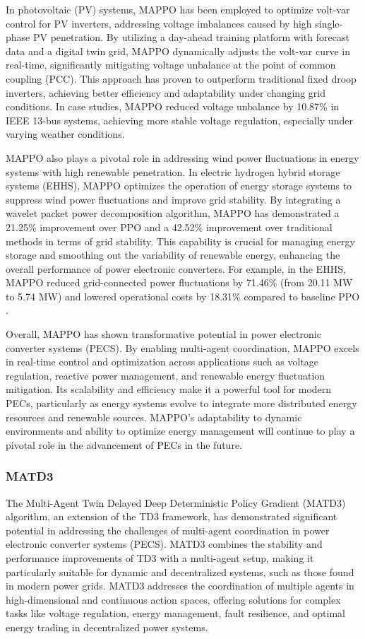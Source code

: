 In photovoltaic (PV) systems, MAPPO has been employed to optimize volt-var control for PV inverters, addressing voltage imbalances caused by high single-phase PV penetration. By utilizing a day-ahead training platform with forecast data and a digital twin grid, MAPPO dynamically adjusts the volt-var curve in real-time, significantly mitigating voltage unbalance at the point of common coupling (PCC). This approach has proven to outperform traditional fixed droop inverters, achieving better efficiency and adaptability under changing grid conditions. In case studies, MAPPO reduced voltage unbalance by 10.87\% in IEEE 13-bus systems, achieving more stable voltage regulation, especially under varying weather conditions.

MAPPO also plays a pivotal role in addressing wind power fluctuations in energy systems with high renewable penetration. In electric hydrogen hybrid storage systems (EHHS), MAPPO optimizes the operation of energy storage systems to suppress wind power fluctuations and improve grid stability. By integrating a wavelet packet power decomposition algorithm, MAPPO has demonstrated a 21.25\% improvement over PPO and a 42.52\% improvement over traditional methods in terms of grid stability. This capability is crucial for managing energy storage and smoothing out the variability of renewable energy, enhancing the overall performance of power electronic converters. For example, in the EHHS, MAPPO reduced grid-connected power fluctuations by 71.46\% (from 20.11 MW to 5.74 MW) and lowered operational costs by 18.31\% compared to baseline PPO \cite{li2024research}.

Overall, MAPPO has shown transformative potential in power electronic converter systems (PECS). By enabling multi-agent coordination, MAPPO excels in real-time control and optimization across applications such as voltage regulation, reactive power management, and renewable energy fluctuation mitigation. Its scalability and efficiency make it a powerful tool for modern PECs, particularly as energy systems evolve to integrate more distributed energy resources and renewable sources. MAPPO’s adaptability to dynamic environments and ability to optimize energy management will continue to play a pivotal role in the advancement of PECs in the future.

\subsubsection{MATD3}

The Multi-Agent Twin Delayed Deep Deterministic Policy Gradient (MATD3) algorithm, an extension of the TD3 framework, has demonstrated significant potential in addressing the challenges of multi-agent coordination in power electronic converter systems (PECS). MATD3 combines the stability and performance improvements of TD3 with a multi-agent setup, making it particularly suitable for dynamic and decentralized systems, such as those found in modern power grids. MATD3 addresses the coordination of multiple agents in high-dimensional and continuous action spaces, offering solutions for complex tasks like voltage regulation, energy management, fault resilience, and optimal energy trading in decentralized power systems.


